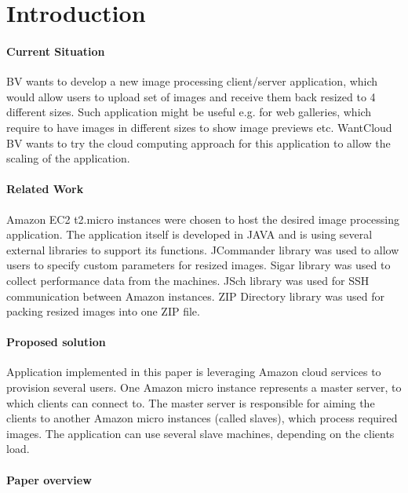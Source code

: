 \section{Introduction}
\paragraph{Current Situation} 
BV wants to develop a new image processing client/server application, which would allow users to upload set of images and receive them back resized to 4 different sizes. Such application might be useful e.g. for web galleries, which require to have images in different sizes to show image previews etc. WantCloud BV wants to try the cloud computing approach for this application to allow the scaling of the application.

\paragraph{Related Work} 
Amazon EC2 t2.micro instances were chosen to host the desired image processing application. The application itself is developed in JAVA and is using several external libraries to support its functions. JCommander library was used to allow users to specify custom parameters for resized images. Sigar library was used to collect performance data from the machines. JSch library was used for SSH communication between Amazon instances. ZIP Directory library was used for packing resized images into one ZIP file.

\paragraph{Proposed solution}
Application implemented in this paper is leveraging Amazon cloud services to provision several users. One Amazon micro instance represents a master server, to which clients can connect to. The master server is responsible for aiming the clients to another Amazon micro instances (called slaves), which process required images. The application can use several slave machines, depending on the clients load.

\paragraph{Paper overview}